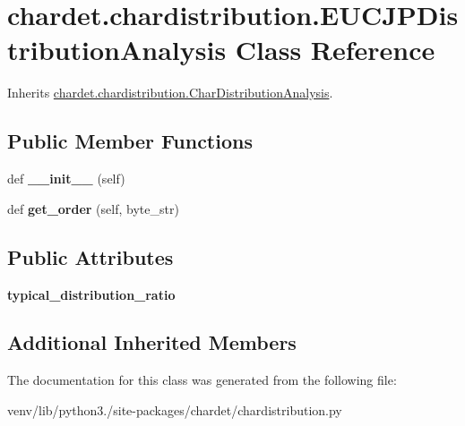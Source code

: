 \hypertarget{classchardet_1_1chardistribution_1_1_e_u_c_j_p_distribution_analysis}{}\section{chardet.\+chardistribution.\+E\+U\+C\+J\+P\+Distribution\+Analysis Class Reference}
\label{classchardet_1_1chardistribution_1_1_e_u_c_j_p_distribution_analysis}


Inherits \hyperlink{classchardet_1_1chardistribution_1_1_char_distribution_analysis}{chardet.\+chardistribution.\+Char\+Distribution\+Analysis}.

\subsection*{Public Member Functions}
\begin{DoxyCompactItemize}
\item 
\mbox{\label{classchardet_1_1chardistribution_1_1_e_u_c_j_p_distribution_analysis_a09aece7a77d592b282ab46565c5d7414}} 
def {\bfseries \+\_\+\+\_\+init\+\_\+\+\_\+} (self)
\item 
\mbox{\label{classchardet_1_1chardistribution_1_1_e_u_c_j_p_distribution_analysis_a4252c1709d6c3316e039333bd47de9c1}} 
def {\bfseries get\+\_\+order} (self, byte\+\_\+str)
\end{DoxyCompactItemize}
\subsection*{Public Attributes}
\begin{DoxyCompactItemize}
\item 
\mbox{\label{classchardet_1_1chardistribution_1_1_e_u_c_j_p_distribution_analysis_a1e5b9345b4d02fa6abfe202046abdac5}} 
{\bfseries typical\+\_\+distribution\+\_\+ratio}
\end{DoxyCompactItemize}
\subsection*{Additional Inherited Members}


The documentation for this class was generated from the following file\+:\begin{DoxyCompactItemize}
\item 
venv/lib/python3./site-\/packages/chardet/chardistribution.\+py\end{DoxyCompactItemize}
